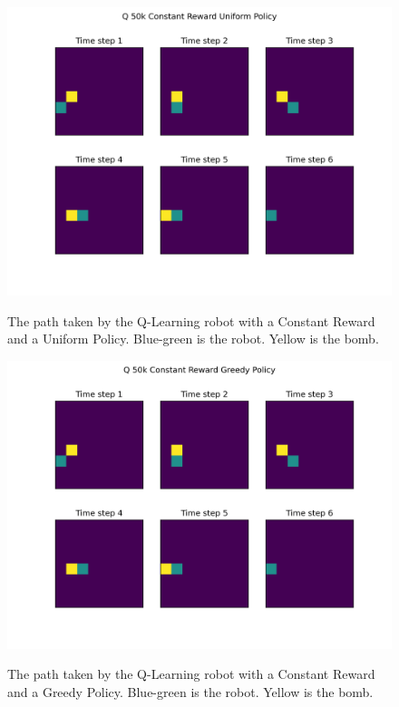 \documentclass[12pt]{article}
\begin{document}
\begin{figure}
  \includegraphics[width=0.95\linewidth]{Figures/q-50k-constant-reward-uniform-policy.png}
  \centering
  \label{fig:qcu}
  \caption{The path taken by the Q-Learning robot with a Constant Reward and a Uniform Policy. Blue-green is the robot. Yellow is the bomb.}
\end{figure}

\begin{figure}
  \includegraphics[width=0.95\linewidth]{Figures/q-50k-constant-reward-greedy-policy.png}
  \centering
  \label{fig:qcg}
  \caption{The path taken by the Q-Learning robot with a Constant Reward and a Greedy Policy. Blue-green is the robot. Yellow is the bomb.}
\end{figure}
\end{document}
